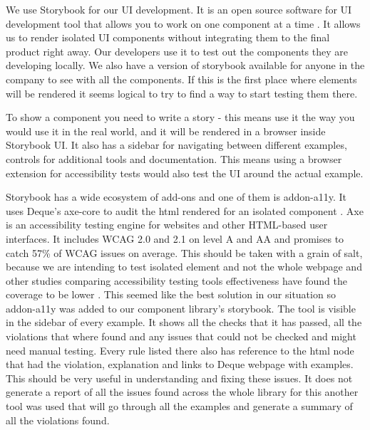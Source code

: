 \documentclass{master_thesis}
\begin{document}
We use Storybook for our UI development. It is an open source software for UI development tool that allows you to work on one component at a time \citep{storybook}. It allows us to render isolated UI components without integrating them to the final product right away. Our developers use it to test out the components they are developing locally. We also have a version of storybook available for anyone in the company to see with all the components. If this is the first place where elements will be rendered it seems logical to try to find a way to start testing them there.

To show a component you need to write a story - this means use it the way you would use it in the real world, and it will be rendered in a browser inside Storybook UI. It also has a sidebar for navigating between different examples, controls for additional tools and documentation. This means using a browser extension for accessibility tests would also test the UI around the actual example.

Storybook has a wide ecosystem of add-ons and one of them is addon-a11y. It uses Deque's axe-core to audit the html rendered for an isolated component \citep{addon-a11y}. Axe is an accessibility testing engine for websites and other HTML-based user interfaces. It includes WCAG 2.0 and 2.1 on level A and AA and promises to catch 57\% of WCAG issues on average. \citep{Deque2023} This should be taken with a grain of salt, because we are intending to test isolated element and not the whole webpage and other studies comparing accessibility testing tools effectiveness have found the coverage to be lower  \citep{needs citation}.
This seemed like the best solution in our situation so addon-a11y was added to our component library's storybook. The tool is visible in the sidebar of every example. It shows all the checks that it has passed, all the violations that where found and any issues that could not be checked and might need manual testing. Every rule listed there also has reference to the html node that had the violation, explanation and links to Deque webpage with examples. This should be very useful in understanding and fixing these issues.
It does not generate a report of all the issues found across the whole library for this another tool was used that will go through all the examples and generate a summary of all the violations found.

\end{document}
